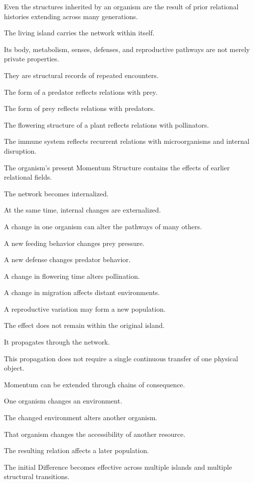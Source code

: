Even the structures inherited by an organism are the result of prior relational histories extending across many generations.

The living island carries the network within itself.

Its body, metabolism, senses, defenses, and reproductive pathways are not merely private properties.

They are structural records of repeated encounters.

The form of a predator reflects relations with prey.

The form of prey reflects relations with predators.

The flowering structure of a plant reflects relations with pollinators.

The immune system reflects recurrent relations with microorganisms and internal disruption.

The organism’s present Momentum Structure contains the effects of earlier relational fields.

The network becomes internalized.

At the same time, internal changes are externalized.

A change in one organism can alter the pathways of many others.

A new feeding behavior changes prey pressure.

A new defense changes predator behavior.

A change in flowering time alters pollination.

A change in migration affects distant environments.

A reproductive variation may form a new population.

The effect does not remain within the original island.

It propagates through the network.

This propagation does not require a single continuous transfer of one physical object.

Momentum can be extended through chains of consequence.

One organism changes an environment.

The changed environment alters another organism.

That organism changes the accessibility of another resource.

The resulting relation affects a later population.

The initial Difference becomes effective across multiple islands and multiple structural transitions.

